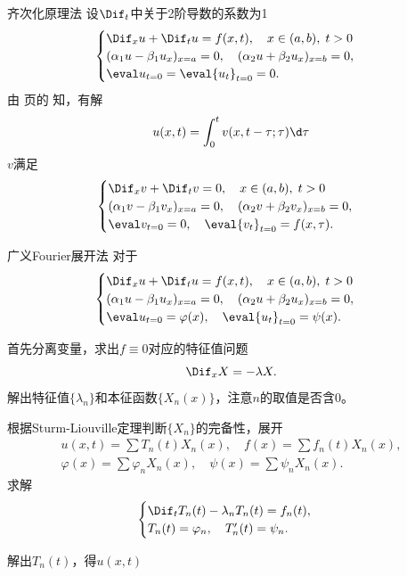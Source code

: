 \begin{method}{齐次化原理法}{}
	设$\Dif_t$中关于2阶导数的系数为1
	\begin{align*}
		\begin{cases}
			\Dif_xu+\Dif_tu=f(x,t),\quad x\in(a,b),\;t>0\\
			(\alpha_1u-\beta_1u_x)_{x=a}=0,\quad(\alpha_2u+\beta_2u_x)_{x=b}=0,\\
			\eval u_{t=0}=\eval{u_t}_{t=0}=0.
		\end{cases}
	\end{align*}
	由 \pageref{thm:Homogeneity Principle} 页的 知，有解
	\[
		u(x,t)=\int_0^tv(x,t-\tau;\tau)\d\tau
	\]
	$v$满足
	\begin{align*}
		\begin{cases}
			\Dif_xv+\Dif_tv=0,\quad x\in(a,b),\;t>0\\
			(\alpha_1v-\beta_1v_x)_{x=a}=0,\quad(\alpha_2v+\beta_2v_x)_{x=b}=0,\\
			\eval v_{t=0}=0,\quad\eval{v_t}_{t=0}=f(x,\tau).
		\end{cases}
	\end{align*}
\end{method}

\begin{method}{广义Fourier展开法}{}
	对于 
	\begin{align*}
		\begin{cases}
			\Dif_xu+\Dif_tu=f(x,t),\quad x\in(a,b),\;t>0\\
			(\alpha_1u-\beta_1u_x)_{x=a}=0,\quad(\alpha_2u+\beta_2u_x)_{x=b}=0,\\
			\eval u_{t=0}=\varphi(x),\quad\eval{u_t}_{t=0}=\psi(x).
		\end{cases}
	\end{align*}
	\begin{compactenum}
		\item 首先分离变量，求出$f\equiv 0$对应的特征值问题
		\[
			\Dif_xX=-\lambda X.
		\]
		解出特征值$\{\lambda_n\}$和本征函数$\{X_n(x)\}$，注意$n$的取值是否含0。
		\item 根据Sturm-Liouville定理判断$\{X_n\}$的完备性，展开
		\begin{gather*}
			u(x,t)=\sum T_n(t)X_n(x),\quad f(x)=\sum f_n(t)X_n(x),\\
			\varphi(x)=\sum\varphi_nX_n(x),\quad \psi(x)=\sum\psi_nX_n(x).
		\end{gather*}
		求解 
		\begin{align*}
			\begin{cases}
				\Dif_tT_n(t)-\lambda_nT_n(t)=f_n(t),\\
				T_n(t)=\varphi_n,\quad T_n'(t)=\psi_n.
			\end{cases}
		\end{align*}
		\item 解出$T_n(t)$，得$u(x,t)$
	\end{compactenum}
\end{method}


